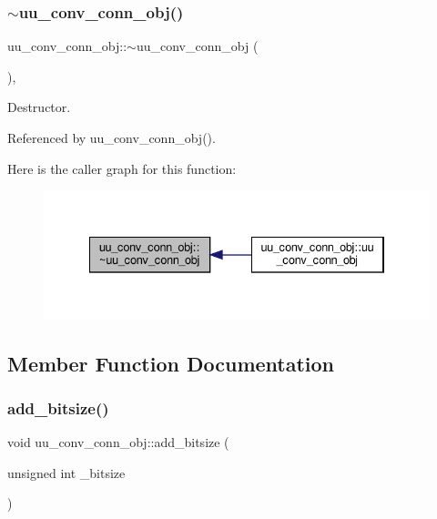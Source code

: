 \subsubsection{\texorpdfstring{$\sim$uu\+\_\+conv\+\_\+conn\+\_\+obj()}{~uu\_conv\_conn\_obj()}}
{\footnotesize\ttfamily uu\+\_\+conv\+\_\+conn\+\_\+obj\+::$\sim$uu\+\_\+conv\+\_\+conn\+\_\+obj (\begin{DoxyParamCaption}{ }\end{DoxyParamCaption})\hspace{0.3cm}{\ttfamily [override]}, {\ttfamily [default]}}



Destructor. 



Referenced by uu\+\_\+conv\+\_\+conn\+\_\+obj().

Here is the caller graph for this function\+:
\nopagebreak
\begin{figure}[H]
\begin{center}
\leavevmode
\includegraphics[width=334pt]{d4/d8c/classuu__conv__conn__obj_ae76c470f81fe09c19357f01bb4b894a3_icgraph}
\end{center}
\end{figure}


\subsection{Member Function Documentation}
\mbox{\label{classuu__conv__conn__obj_a2f9e62e2af2e3c497c8027e4bd128599}} 
\subsubsection{\texorpdfstring{add\+\_\+bitsize()}{add\_bitsize()}}
{\footnotesize\ttfamily void uu\+\_\+conv\+\_\+conn\+\_\+obj\+::add\+\_\+bitsize (\begin{DoxyParamCaption}\item[{unsigned int}]{\+\_\+bitsize }\end{DoxyParamCaption})\hspace{0.3cm}{\ttfamily [inline]}}




